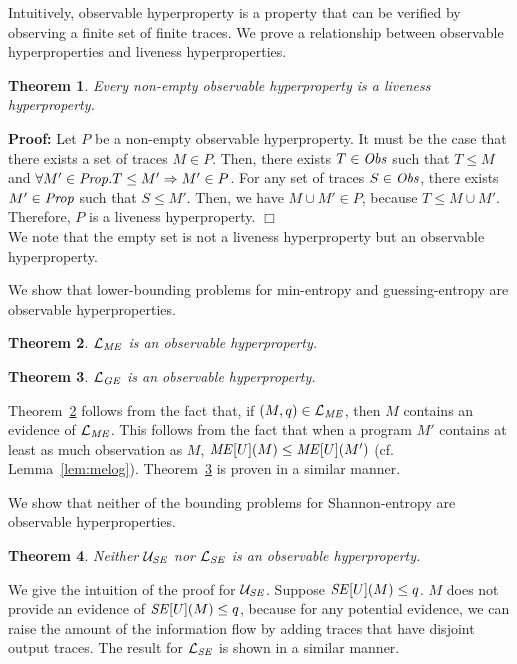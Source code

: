 \documentclass[]{eptcs}
\newtheorem{theorem}{Theorem}[section]
\newenvironment{proof}{\noindent\rm{\bf Proof:}}{\hbox{$\Box$}\vspace*{0.2\baselineskip}}
\begin{document}
Intuitively, observable hyperproperty is a property that can be verified
by observing a finite set of finite traces.  We prove a relationship
between observable hyperproperties and liveness hyperproperties.
\begin{theorem}
\label{thm:nonempty}
  Every non-empty observable hyperproperty is a liveness
  hyperproperty.
\end{theorem}
\begin{proof}
  Let $P$ be a non-empty observable hyperproperty.  It must be the
  case that there exists a set of traces $M\in P$.  Then, there exists
  $T\in {\it Obs}$ such that $T\le M$ and $\forall M'\in{\it Prop}.
  T\le M'\Rightarrow M'\in P$.  For any set of traces $S\in{\it Obs}$,
  there exists $M'\in {\it Prop}$ such that $S\le M'$.  Then, we have
  $M\cup M'\in P$, because $T\le M\cup M'$.  Therefore, $P$ is a
  liveness hyperproperty.
\end{proof}\\
We note that the empty set is not a liveness hyperproperty but an
observable hyperproperty.

We show that lower-bounding problems for min-entropy and
guessing-entropy are observable hyperproperties.
\begin{theorem}
\label{thm:LMEsl}
  $\mathcal{L}_{\it ME}$ is an observable hyperproperty.
\end{theorem}
\begin{theorem}
\label{thm:LGEsl}
  $\mathcal{L}_{\it GE}$ is an observable hyperproperty.
\end{theorem}
Theorem~\ref{thm:LMEsl} follows from the fact that, if $(M,q)\in
\mathcal{L}_{\it ME}$, then $M$ contains an evidence of
$\mathcal{L}_{\it ME}$.  This follows from the fact that when a
program $M'$ contains at least as much observation as $M$, ${\it
  ME}[U](M) \leq {\it ME}[U](M')$ (cf. Lemma~\ref{lem:melog}).
Theorem~\ref{thm:LGEsl} is proven in a similar manner.

We show that neither of the bounding problems for Shannon-entropy are
observable hyperproperties.
\begin{theorem}
\label{thm:ULSEnsl}
  Neither $\mathcal{U}_{\it SE}$ nor $\mathcal{L}_{\it SE}$ is an
  observable hyperproperty.
\end{theorem}
We give the intuition of the proof for $\mathcal{U}_{\it SE}$.
Suppose ${\it SE}[U](M)\le q$.  $M$ does not provide an evidence of
${\it SE}[U](M)\le q$, because for any potential evidence, we can
raise the amount of the information flow by adding traces that have
disjoint output traces.  The result for $\mathcal{L}_{\it SE}$ is
shown in a similar manner.
\end{document}
